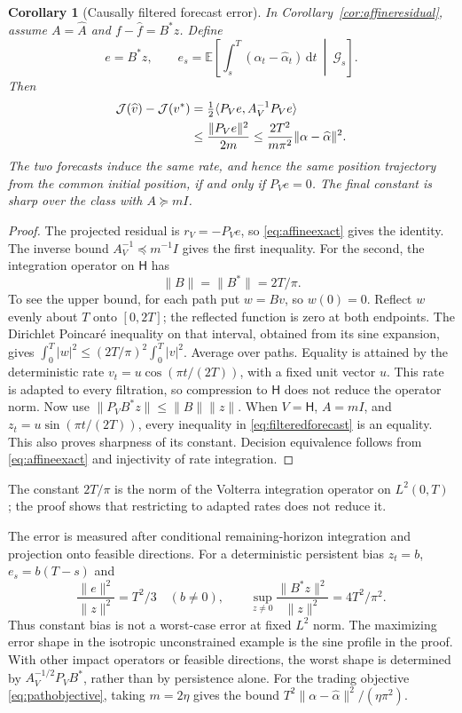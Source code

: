 \documentclass[11pt]{article}
\theoremstyle{plain}
\newtheorem{corollary}[theorem]{Corollary}
\theoremstyle{definition}
\theoremstyle{remark}
\newcommand{\E}{\mathbb E}
\newcommand{\dd}{\,\mathrm d}
\newcommand{\norm}[1]{\lVert#1\rVert}
\newcommand{\ip}[2]{\langle#1,#2\rangle}
\begin{document}
\begin{corollary}[Causally filtered forecast error]
\label{cor:filteredforecast}
In Corollary~\ref{cor:affineresidual}, assume
\(A=\widehat A\) and \(f-\widehat f=B^\ast z\). Define
\[
e=B^\ast z,\qquad
e_s=\E\left[\int_s^T(\alpha_t-\widehat\alpha_t)\dd t
                              \ \middle|\ \mathcal G_s\right].
\]
Then
\begin{align}
\mathcal J(\widehat v)-\mathcal J(v^\ast)
&=\tfrac12\ip{P_Ve}{A_V^{-1}P_Ve}\notag\\
&\le\frac{\norm{P_Ve}^2}{2m}
\le\frac{2T^2}{m\pi^2}\norm{\alpha-\widehat\alpha}^2.
\label{eq:filteredforecast}
\end{align}
The two forecasts induce the same rate, and hence the same position
trajectory from the common initial position, if and only if
\(P_Ve=0\). The final constant is sharp over the class with
\(A\succeq mI\).
\end{corollary}
\begin{proof}
The projected residual is \(r_V=-P_Ve\), so
\eqref{eq:affineexact} gives the identity. The inverse bound
\(A_V^{-1}\preceq m^{-1}I\) gives the first inequality.
For the second, the integration operator on \(\mathsf H\) has
\begin{equation}\label{eq:sharpvolterra}
\norm B=\norm{B^\ast}=2T/\pi.
\end{equation}
To see the upper bound, for each path put \(w=Bv\), so \(w(0)=0\).
Reflect \(w\) evenly about \(T\) onto \([0,2T]\); the reflected
function is zero at both endpoints. The Dirichlet Poincar\'e inequality
on that interval, obtained from its sine expansion, gives
\(\int_0^T|w|^2\le(2T/\pi)^2\int_0^T|v|^2\).
Average over paths. Equality is attained by the deterministic rate
\(v_t=u\cos(\pi t/(2T))\), with a fixed unit vector \(u\).
This rate is adapted to every filtration, so compression to
\(\mathsf H\) does not reduce the operator norm.
Now use \(\norm{P_VB^\ast z}\le\norm B\norm z\).
When \(V=\mathsf H\), \(A=mI\), and
\(z_t=u\sin(\pi t/(2T))\), every inequality in
\eqref{eq:filteredforecast} is an equality. This also proves
sharpness of its constant. Decision equivalence follows from
\eqref{eq:affineexact} and injectivity of rate integration.
\end{proof}

The constant $2T/\pi$ is the norm of the Volterra integration operator on
$L^2(0,T)$ \citep{Halmos1982}; the proof shows that restricting to adapted rates
does not reduce it.

The error is measured after conditional remaining-horizon integration
and projection onto feasible directions. For a deterministic persistent
bias \(z_t=b\), \(e_s=b(T-s)\) and
\[
\frac{\norm e^2}{\norm z^2}=T^2/3
\quad(b\ne0),\qquad
\sup_{z\ne0}\frac{\norm{B^\ast z}^2}{\norm z^2}=4T^2/\pi^2.
\]
Thus constant bias is not a worst-case error at fixed \(L^2\) norm.
The maximizing error shape in the isotropic unconstrained example is
the sine profile in the proof. With other impact operators or feasible
directions, the worst shape is determined by
\(A_V^{-1/2}P_VB^\ast\), rather than by persistence alone.
For the trading objective \eqref{eq:pathobjective}, taking
\(m=2\eta\) gives the bound
\(T^2\norm{\alpha-\widehat\alpha}^2/(\eta\pi^2)\).
\end{document}
